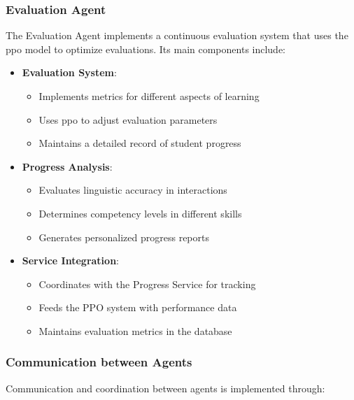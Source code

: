 \subsubsection{Evaluation Agent}

The Evaluation Agent implements a continuous evaluation system that uses the \gls{ppo} model to optimize evaluations. Its main components include:

\begin{itemize}
    \item \textbf{Evaluation System}:
    \begin{itemize}
        \item Implements metrics for different aspects of learning
        \item Uses \gls{ppo} to adjust evaluation parameters
        \item Maintains a detailed record of student progress
    \end{itemize}

    \item \textbf{Progress Analysis}:
    \begin{itemize}
        \item Evaluates linguistic accuracy in interactions
        \item Determines competency levels in different skills
        \item Generates personalized progress reports
    \end{itemize}

    \item \textbf{Service Integration}:
    \begin{itemize}
        \item Coordinates with the Progress Service for tracking
        \item Feeds the PPO system with performance data
        \item Maintains evaluation metrics in the database
    \end{itemize}
\end{itemize}

\subsubsection{Communication between Agents}

Communication and coordination between agents is implemented through:

